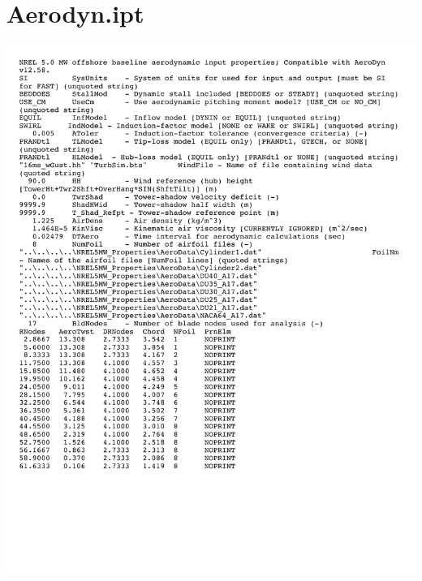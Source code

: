\section{Aerodyn.ipt} \label{sectionA-2}

\noindent
\includegraphics[width=\linewidth]{Figures/AppendixAFigures/aerodyn.pdf}		
